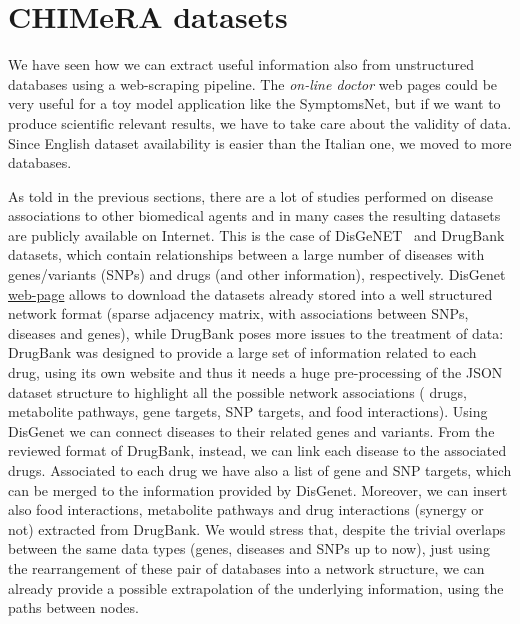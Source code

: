 \documentclass{standalone}
\begin{document}
\section[Dataset]{CHIMeRA datasets}\label{chimera:net}

We have seen how we can extract useful information also from unstructured databases using a \textsf{web-scraping} pipeline.
The \emph{on-line doctor} web pages could be very useful for a toy model application like the \textsf{SymptomsNet}, but if we want to produce scientific relevant results, we have to take care about the validity of data.
Since English dataset availability is easier than the Italian one, we moved to more  databases.

As told in the previous sections, there are a lot of studies performed on disease associations to other biomedical agents and in many cases the resulting datasets are publicly available on Internet.
This is the case of DisGeNET~\cite{DisGeNet} and DrugBank~\cite{DrugBank} datasets, which contain relationships between a large number of diseases with genes/variants (SNPs) and drugs (and other information), respectively.
DisGenet \href{https://doi.org/10.1093/nar/gkw943}{web-page} allows to download the datasets already stored into a well structured network format (sparse adjacency matrix, with  associations between  SNPs,  diseases and  genes), while DrugBank poses more issues to the treatment of data: DrugBank was designed to provide a large set of information related to each drug, using its own website and thus it needs a huge pre-processing of the JSON dataset structure to highlight all the possible network associations ( drugs,  metabolite pathways,  gene targets,  SNP targets, and  food interactions).
Using DisGenet we can connect diseases to their related genes and variants.
From the reviewed format of DrugBank, instead, we can link each disease to the associated drugs.
Associated to each drug we have also a list of gene and SNP targets, which can be merged to the information provided by DisGenet.
Moreover, we can insert also food interactions, metabolite pathways and drug interactions (synergy or not) extracted from DrugBank.
We would stress that, despite the trivial overlaps between the same data types (genes, diseases and SNPs up to now), just using the rearrangement of these pair of databases into a network structure, we can already provide a possible extrapolation of the underlying information, using the paths between nodes.
\end{document}
